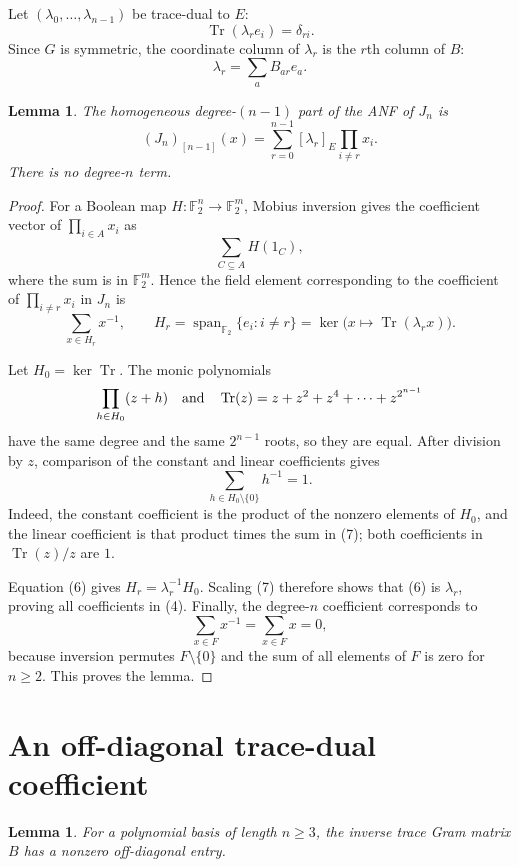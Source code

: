 \documentclass[11pt]{article}
\newtheorem{lemma}[theorem]{Lemma}
\newcommand{\F}{\mathbb F}
\newcommand{\Tr}{\operatorname{Tr}}
\begin{document}
Let $(\lambda_0,\ldots,\lambda_{n-1})$ be trace-dual to $E$:
\[
                   \Tr(\lambda_r e_i)=\delta_{ri}.
\]
Since $G$ is symmetric, the coordinate column of $\lambda_r$ is the
$r$th column of $B$:
\[
                         \lambda_r=\sum_a B_{ar}e_a.       \tag{3}
\]

\begin{lemma}\label{lem:top}
The homogeneous degree-$(n-1)$ part of the ANF of $J_n$ is
\[
 (J_n)_{[n-1]}(x)
   =\sum_{r=0}^{n-1}[\lambda_r]_E\prod_{i\ne r}x_i.       \tag{4}
\]
There is no degree-$n$ term.
\end{lemma}

\begin{proof}
For a Boolean map $H:\F_2^n\to\F_2^m$, Mobius inversion gives the
coefficient vector of $\prod_{i\in A}x_i$ as
\[
                         \sum_{C\subseteq A}H(1_C),        \tag{5}
\]
where the sum is in $\F_2^m$.  Hence the field element corresponding to
the coefficient of $\prod_{i\ne r}x_i$ in $J_n$ is
\[
 \sum_{x\in H_r}x^{-1},\qquad
 H_r=\operatorname{span}_{\F_2}\{e_i:i\ne r\}
    =\ker\bigl(x\mapsto\Tr(\lambda_r x)\bigr).            \tag{6}
\]

Let $H_0=\ker\Tr$.  The monic polynomials
\[
 \prod_{h\in H_0}(z+h)
 \quad\hbox{and}\quad
 \Tr(z)=z+z^2+z^4+\cdots+z^{2^{n-1}}
\]
have the same degree and the same $2^{n-1}$ roots, so they are equal.
After division by $z$, comparison of the constant and linear coefficients
gives
\[
                 \sum_{h\in H_0\setminus\{0\}}h^{-1}=1.  \tag{7}
\]
Indeed, the constant coefficient is the product of the nonzero elements of
$H_0$, and the linear coefficient is that product times the sum in (7);
both coefficients in $\Tr(z)/z$ are $1$.

Equation (6) gives $H_r=\lambda_r^{-1}H_0$.  Scaling (7) therefore shows
that (6) is $\lambda_r$, proving all coefficients in (4).  Finally, the
degree-$n$ coefficient corresponds to
\[
  \sum_{x\in F}x^{-1}=\sum_{x\in F}x=0,
\]
because inversion permutes $F\setminus\{0\}$ and the sum of all elements of
$F$ is zero for $n\geq2$.  This proves the lemma.
\end{proof}

\section{An off-diagonal trace-dual coefficient}

\begin{lemma}\label{lem:offdiag}
For a polynomial basis of length $n\geq3$, the inverse trace Gram matrix
$B$ has a nonzero off-diagonal entry.
\end{lemma}
\end{document}
